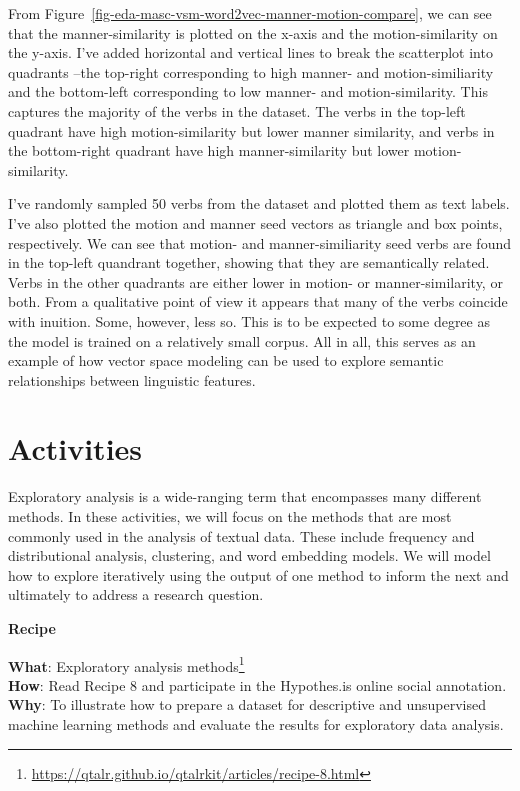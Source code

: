 \documentclass[
  letterpaper,
  DIV=11,
  numbers=noendperiod]{scrreprt}
\theoremstyle{definition}
\theoremstyle{remark}
\DeclareRobustCommand{\href}[2]{#2\footnote{\url{#1}}}
\begin{document}
From Figure~\ref{fig-eda-masc-vsm-word2vec-manner-motion-compare}, we
can see that the manner-similarity is plotted on the x-axis and the
motion-similarity on the y-axis. I've added horizontal and vertical
lines to break the scatterplot into quadrants --the top-right
corresponding to high manner- and motion-similiarity and the bottom-left
corresponding to low manner- and motion-similarity. This captures the
majority of the verbs in the dataset. The verbs in the top-left quadrant
have high motion-similarity but lower manner similarity, and verbs in
the bottom-right quadrant have high manner-similarity but lower
motion-similarity.

I've randomly sampled 50 verbs from the dataset and plotted them as text
labels. I've also plotted the motion and manner seed vectors as triangle
and box points, respectively. We can see that motion- and
manner-similiarity seed verbs are found in the top-left quandrant
together, showing that they are semantically related. Verbs in the other
quadrants are either lower in motion- or manner-similarity, or both.
From a qualitative point of view it appears that many of the verbs
coincide with inuition. Some, however, less so. This is to be expected
to some degree as the model is trained on a relatively small corpus. All
in all, this serves as an example of how vector space modeling can be
used to explore semantic relationships between linguistic features.

\section*{Activities}\label{activities-6}


Exploratory analysis is a wide-ranging term that encompasses many
different methods. In these activities, we will focus on the methods
that are most commonly used in the analysis of textual data. These
include frequency and distributional analysis, clustering, and word
embedding models. We will model how to explore iteratively using the
output of one method to inform the next and ultimately to address a
research question.

\begin{tcolorbox}[enhanced jigsaw, leftrule=.75mm, colframe=quarto-callout-color-frame, colback=white, rightrule=.15mm, opacityback=0, arc=.35mm, breakable, bottomrule=.15mm, left=2mm, toprule=.15mm]

\textbf{ Recipe}

\textbf{What}:
\href{https://qtalr.github.io/qtalrkit/articles/recipe-8.html}{Exploratory
analysis methods}\\
\textbf{How}: Read Recipe 8 and participate in the Hypothes.is online
social annotation.\\
\textbf{Why}: To illustrate how to prepare a dataset for descriptive and
unsupervised machine learning methods and evaluate the results for
exploratory data analysis.

\end{tcolorbox}
\end{document}
